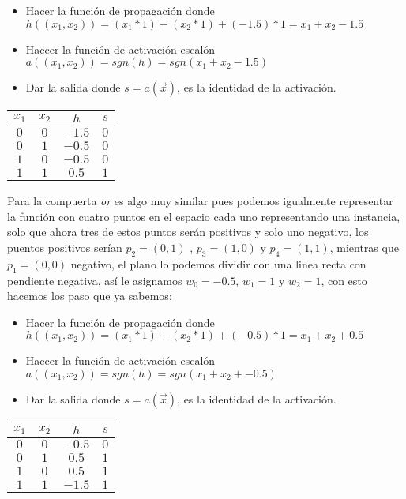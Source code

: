 \begin{itemize}
 \item Hacer la función de propagación donde $h((x_{1},x_{2})) =  (x_{1} * 1) + (x_{2} *1) + (-1.5) * 1 = x_{1} + x_{2} - 1.5$
 \item Haccer la función de activación escalón $a((x_{1},x_{2})) = sgn(h) = sgn(x_{1} + x_{2} - 1.5)$ 
 \item Dar la salida donde $s = a(\vec{x})$, es la identidad de la activación.
\end{itemize}

\begin{table}[H]
 \centering
\begin{tabular}{ | c | c| c |c | } 
 \hline
 $x_{1}$ & $x_{2}$ & $h$ & $s$ \\
 \hline
 $0$ & $0$ & $-1.5$ & $0$ \\
 \hline
 $0$ & $1$ & $-0.5$ & $0$ \\
 \hline
 $1$ & $0$ & $-0.5$ & $0$ \\
 \hline
 $1$ & $1$ & $0.5$ & $1$ \\
\hline
\end{tabular}
 
\end{table}


Para la compuerta \emph{or} es algo muy similar pues podemos igualmente representar la función con cuatro puntos en el espacio cada uno representando una instancia, solo que ahora tres de estos puntos serán positivos y solo uno negativo, los puentos positivos serían $p_{2} = (0,1)$ , $p_{3} = (1,0)$ y $p_{4} = (1,1)$, mientras que $p_{1} = (0,0)$ negativo, el plano lo podemos dividir con una linea recta con pendiente negativa, así le asignamos $w_{0} = - 0.5$, $w_{1} = 1$ y $w_{2} = 1$, con esto hacemos los paso que ya sabemos:

\begin{itemize}
 \item Hacer la función de propagación donde $h((x_{1},x_{2})) = (x_{1} * 1) + (x_{2} *1) + (-0.5) * 1 = x_{1} + x_{2} + 0.5$
 \item Haccer la función de activación escalón $a((x_{1},x_{2})) = sgn(h) = sgn(x_{1} + x_{2} + -0.5)$ 
 \item Dar la salida donde $s = a(\vec{x})$, es la identidad de la activación.
\end{itemize}

\begin{table}[H]
 \centering
\begin{tabular}{ | c | c| c |c | } 
 \hline
 $x_{1}$ & $x_{2}$ & $h$ & $s$ \\
 \hline
 $0$ & $0$ & $-0.5$ & $0$ \\
 \hline
 $0$ & $1$ & $0.5$ & $1$ \\
 \hline
 $1$ & $0$ & $0.5$ & $1$ \\
 \hline
 $1$ & $1$ & $-1.5$ & $1$ \\
\hline
\end{tabular}
 
\end{table}


